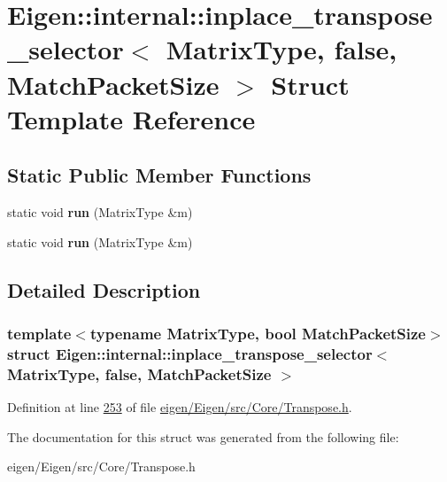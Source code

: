 \hypertarget{struct_eigen_1_1internal_1_1inplace__transpose__selector_3_01_matrix_type_00_01false_00_01_match_packet_size_01_4}{}\section{Eigen\+:\+:internal\+:\+:inplace\+\_\+transpose\+\_\+selector$<$ Matrix\+Type, false, Match\+Packet\+Size $>$ Struct Template Reference}
\label{struct_eigen_1_1internal_1_1inplace__transpose__selector_3_01_matrix_type_00_01false_00_01_match_packet_size_01_4}
\subsection*{Static Public Member Functions}
\begin{DoxyCompactItemize}
\item 
\mbox{\label{struct_eigen_1_1internal_1_1inplace__transpose__selector_3_01_matrix_type_00_01false_00_01_match_packet_size_01_4_af766cb185ec88d2809afc4ed7dd2f3a9}} 
static void {\bfseries run} (Matrix\+Type \&m)
\item 
\mbox{\label{struct_eigen_1_1internal_1_1inplace__transpose__selector_3_01_matrix_type_00_01false_00_01_match_packet_size_01_4_af766cb185ec88d2809afc4ed7dd2f3a9}} 
static void {\bfseries run} (Matrix\+Type \&m)
\end{DoxyCompactItemize}


\subsection{Detailed Description}
\subsubsection*{template$<$typename Matrix\+Type, bool Match\+Packet\+Size$>$\newline
struct Eigen\+::internal\+::inplace\+\_\+transpose\+\_\+selector$<$ Matrix\+Type, false, Match\+Packet\+Size $>$}



Definition at line \hyperlink{eigen_2_eigen_2src_2_core_2_transpose_8h_source_l00253}{253} of file \hyperlink{eigen_2_eigen_2src_2_core_2_transpose_8h_source}{eigen/\+Eigen/src/\+Core/\+Transpose.\+h}.



The documentation for this struct was generated from the following file\+:\begin{DoxyCompactItemize}
\item 
eigen/\+Eigen/src/\+Core/\+Transpose.\+h\end{DoxyCompactItemize}
